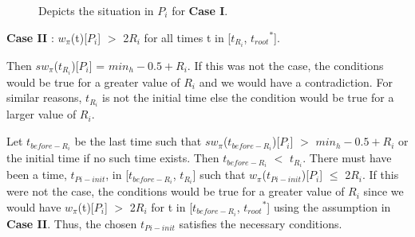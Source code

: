 \documentclass[12pt]{article}
\newcommand{\troots}{{t_{root}}^*}
\begin{document}
\begin{figure}[H]
  \centering
\caption{Depicts the situation in $P_i$ for {\bf Case I}.}
\end{figure}

\noindent
{\bf Case II} :  $w_{\pi}$(t)[$P_i$] $>$ 2$R_i$ for all times t in [$t_{R_i}$, $\troots$].

Then $sw_{\pi}$($t_{R_i}$)[$P_i$] = $min_h-0.5+R_i$. If this was not the case, the conditions would be true for a greater value of ${R_i}$ and we would have a contradiction. For similar reasons, $t_{R_i}$ is not the initial time else the condition would be true for a larger value of $R_i$.

Let $t_{before-R_i}$ be the last time such that $sw_{\pi}$($t_{before-R_i}$)[$P_i$] $>$ $min_h-0.5+R_i$ or the initial time if no such time exists. Then $t_{before-R_i}$ $<$ $t_{R_i}$. There must have been a time, $t_{Pi-init}$,  in [$t_{before-R_i}$, $t_{R_i}$] such that $w_{\pi}$($t_{Pi-init}$)[$P_i$] $\leq$ 2$R_i$. If this were not the case, the conditions would be true for a greater value of ${R_i}$ since we would have $w_{\pi}$(t)[$P_i$] $>$ 2${R_i}$ for t in [$t_{before-R_i}$, $\troots$] using the assumption in {\bf Case II}. Thus, the chosen $t_{Pi-init}$ satisfies the necessary conditions.

\end{document}
